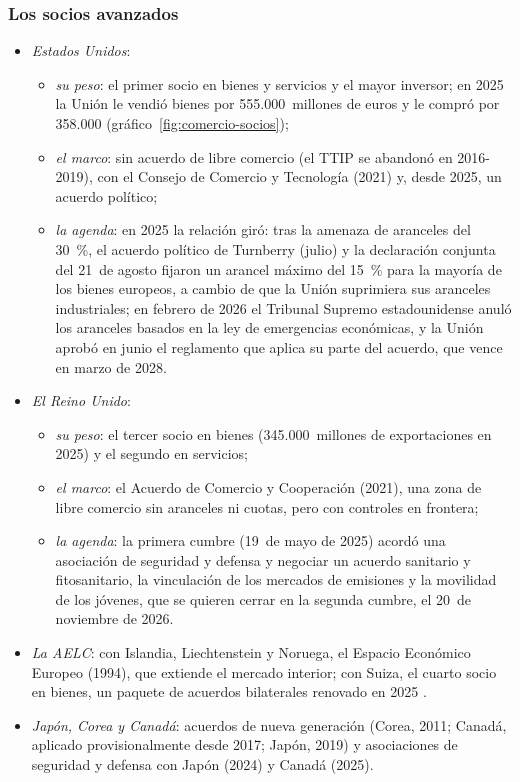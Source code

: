\documentclass[11pt]{article}
\begin{document}
\subsubsection{Los socios avanzados}\label{sec:socios-avanzados}

\begin{itemize}
\item \emph{Estados Unidos}:
  \begin{itemize}
  \item \emph{su peso}: el primer socio en bienes y servicios y el mayor inversor; en 2025 la Unión le vendió bienes por 555.000~millones de euros y le compró por 358.000 (gráfico~\ref{fig:comercio-socios})\nocite{Eurostat2026ComercioSITC};
  \item \emph{el marco}: sin acuerdo de libre comercio (el TTIP se abandonó en 2016-2019), con el Consejo de Comercio y Tecnología (2021) y, desde 2025, un acuerdo político;
  \item \emph{la agenda}: en 2025 la relación giró: tras la amenaza de aranceles del 30~\%, el acuerdo político de Turnberry (julio) y la declaración conjunta del 21~de agosto fijaron un arancel máximo del 15~\% para la mayoría de los bienes europeos, a cambio de que la Unión suprimiera sus aranceles industriales\nocite{UE2025DeclaracionEEUU}; en febrero de 2026 el Tribunal Supremo estadounidense anuló los aranceles basados en la ley de emergencias económicas, y la Unión aprobó en junio el reglamento que aplica su parte del acuerdo, que vence en marzo de 2028.
  \end{itemize}
\item \emph{El Reino Unido}:
  \begin{itemize}
  \item \emph{su peso}: el tercer socio en bienes (345.000~millones de exportaciones en 2025) y el segundo en servicios;
  \item \emph{el marco}: el Acuerdo de Comercio y Cooperación (2021), una zona de libre comercio sin aranceles ni cuotas, pero con controles en frontera;
  \item \emph{la agenda}: la primera cumbre (19~de mayo de 2025) acordó una asociación de seguridad y defensa y negociar un acuerdo sanitario y fitosanitario, la vinculación de los mercados de emisiones y la movilidad de los jóvenes, que se quieren cerrar en la segunda cumbre, el 20~de noviembre de 2026.
  \end{itemize}
\item \emph{La AELC}: con Islandia, Liechtenstein y Noruega, el Espacio Económico Europeo (1994), que extiende el mercado interior; con Suiza, el cuarto socio en bienes, un paquete de acuerdos bilaterales renovado en 2025 .
\item \emph{Japón, Corea y Canadá}: acuerdos de nueva generación (Corea, 2011; Canadá, aplicado provisionalmente desde 2017; Japón, 2019) y asociaciones de seguridad y defensa con Japón (2024) y Canadá (2025).
\end{itemize}
\end{document}
